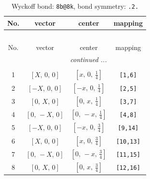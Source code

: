 \documentclass[fleqn,8pt]{jsarticle}
\begin{document}
\begin{longtable}{cccc}
\caption{Wyckoff bond: {\tt 8b@8k}, bond symmetry: {\tt .2.}}
 \\
 \hline \hline
No. & vector & center & mapping \\ \hline \endfirsthead

\multicolumn{3}{l}{\tablename\ \thetable{}} \\
 \hline \hline
No. & vector & center & mapping \\ \hline \endhead

 \hline \hline
\multicolumn{3}{r}{\footnotesize\it continued ...} \\ \endfoot

 \hline \hline
\multicolumn{3}{r}{} \\ \endlastfoot

1 & $\left[ X,\, 0,\, 0 \right]$ & $\left[ x,\, 0,\, \frac{1}{4} \right]$ & {\tt [1,6]} \\ \hline
2 & $\left[ - X,\, 0,\, 0 \right]$ & $\left[ - x,\, 0,\, \frac{1}{4} \right]$ & {\tt [2,5]} \\ \hline
3 & $\left[ 0,\, X,\, 0 \right]$ & $\left[ 0,\, x,\, \frac{1}{4} \right]$ & {\tt [3,7]} \\ \hline
4 & $\left[ 0,\, - X,\, 0 \right]$ & $\left[ 0,\, - x,\, \frac{1}{4} \right]$ & {\tt [4,8]} \\ \hline
5 & $\left[ - X,\, 0,\, 0 \right]$ & $\left[ - x,\, 0,\, \frac{3}{4} \right]$ & {\tt [9,14]} \\ \hline
6 & $\left[ X,\, 0,\, 0 \right]$ & $\left[ x,\, 0,\, \frac{3}{4} \right]$ & {\tt [10,13]} \\ \hline
7 & $\left[ 0,\, - X,\, 0 \right]$ & $\left[ 0,\, - x,\, \frac{3}{4} \right]$ & {\tt [11,15]} \\ \hline
8 & $\left[ 0,\, X,\, 0 \right]$ & $\left[ 0,\, x,\, \frac{3}{4} \right]$ & {\tt [12,16]} \\
\end{longtable}
\renewcommand{\arraystretch}{1.2}
\end{document}

